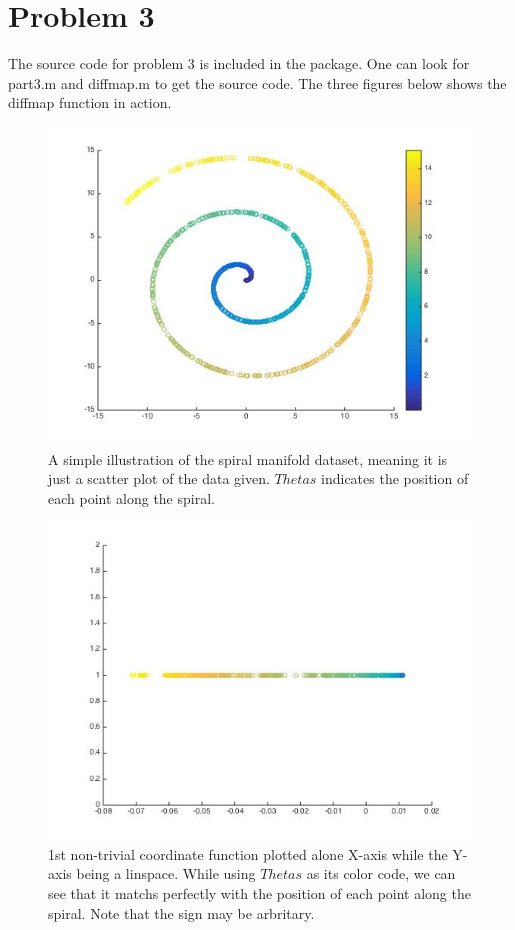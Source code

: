 \documentclass[twoside]{article}
\theoremstyle{definition}
\theoremstyle{definition}
\theoremstyle{remark}
\begin{document}
\section{Problem 3}
The source code for problem 3 is included in the package. One can look for part3.m and diffmap.m to get the source code. The three figures below shows the diffmap function in action.
\begin{figure}[H]
\centering
\includegraphics[width=120mm]{part3_1.jpg}
\caption{ A simple illustration of the spiral manifold dataset, meaning it is just a scatter plot of the data given. $Thetas$ indicates the position of each point along the spiral.  \label{problem1Pic2}}
\end{figure}

\begin{figure}[H]
\centering
\includegraphics[width=120mm]{part3_2.jpg}
\caption{ 1st non-trivial coordinate function plotted alone X-axis while the Y-axis being a linspace. While using $Thetas$ as its color code, we can see that it matchs perfectly with the position of each point along the spiral. Note that the sign may be arbritary.  \label{problem1Pic2}}
\end{figure}
\end{document}
